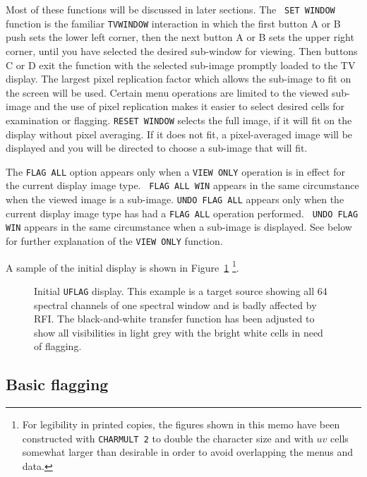 \documentclass[twoside]{article}
\newcommand{\putfig}[1]{\texttt{[image: \#1]}}
\begin{document}
Most of these functions will be discussed in later sections.  The {\tt
  SET WINDOW} function is the familiar {\tt TVWINDOW} interaction in
which the first button A or B push sets the lower left corner, then
the next button A or B sets the upper right corner, until you have
selected the desired sub-window for viewing.  Then buttons C or D
exit the function with the selected sub-image promptly loaded to the
TV display.  The largest pixel replication factor which allows the
sub-image to fit on the screen will be used.  Certain menu operations
are limited to the viewed sub-image and the use of pixel replication
makes it easier to select desired cells for examination or flagging.
{\tt RESET WINDOW} selects the full image, if it will fit on the
display without pixel averaging.  If it does not fit, a pixel-averaged
image will be displayed and you will be directed to choose a sub-image
that will fit.

The {\tt FLAG ALL} option appears only when a {\tt VIEW ONLY}
operation is in effect for the current display image type.  {\tt
  FLAG ALL WIN} appears in the same circumstance when the viewed image
is a sub-image.  {\tt UNDO FLAG ALL} appears only when the current
display image type has had a {\tt FLAG ALL} operation performed.  {\tt
  UNDO FLAG WIN} appears in the same circumstance when a sub-image is
displayed.  See below for further explanation of the {\tt VIEW ONLY}
function.

A sample of the initial display is shown in Figure~\ref{fig:Target}
\footnote{For legibility in printed copies, the figures shown in this
  memo have been constructed with {\tt CHARMULT 2} to double the
  character size and with $uv$ cells somewhat larger than desirable in
  order to avoid overlapping the menus and data.}.

\begin{figure}
\begin{center}
\resizebox{6.5in}{!}{\putfig{Target.eps}}
\caption{Initial {\tt UFLAG} display.  This example is a target source
  showing all 64 spectral channels of one spectral window and is badly
  affected by RFI.  The black-and-white transfer function has been
  adjusted to show all visibilities in light grey with the bright
  white cells in need of flagging.}
\label{fig:Target}
\end{center}
\end{figure}

\subsection{Basic flagging}
\end{document}
